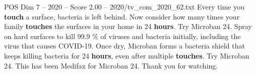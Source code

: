 \begin{textsample}{POS Dim 7 – 2020 – Score 2.00 – 2020/tv\_com\_2020\_62.txt}  \label{ex:f7_pos_082}
Every time you \textbf{touch} a surface, bacteria is left behind.
Now consider how many times your family \textbf{touches} the surfaces in your home in 24 \textbf{hours}.
Try Microban 24.
Spray on hard surfaces to kill 99.9 \% of viruses and bacteria initially, including the virus that causes COVID-19.
Once dry, Microban forms a bacteria shield that keeps killing bacteria for 24 \textbf{hours}, even after multiple \textbf{touches}.
Try Microban 24.
This has been Medifax for Microban 24.
Thank you for watching.

\end{textsample}
